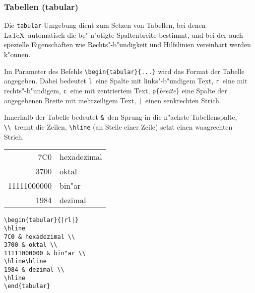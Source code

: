 \subsubsection{Tabellen (tabular)} \label{tabular}
 
Die \texttt{tabular}-Umgebung dient zum Setzen von Tabellen, bei
denen \LaTeX\ automatisch die be"-n"otigte Spaltenbreite
bestimmt, und bei der auch spezielle Eigenschaften wie
Rechts"-b"undigkeit und Hilfslinien vereinbart werden k"onnen.
 
Im Parameter des Befehls \verb|\begin{tabular}{...}| wird das
Format der Tabelle angegeben.
Dabei bedeutet
\texttt{l}~eine Spalte mit links"-b"undigem Text,
\texttt{r}~eine mit rechts"-b"undigem,
\texttt{c}~eine mit zentriertem Text,
\verb|p{|\textit{breite}\verb|}| eine Spalte der angegebenen
Breite mit mehrzeiligem Text,
\verb.|.~einen senkrechten Strich.
 
Innerhalb der Tabelle bedeutet
\verb|&|~den Sprung in die n"achste Tabellenspalte,
\verb|\\|~trennt die Zeilen,
\verb|\hline| (an Stelle einer Zeile) setzt einen waagrechten
Strich.
 
          \vspace{0pt plus 1cm}
\exa
\begin{tabular}[t]{|rl|}
\hline
7C0 & hexadezimal \\
3700 & oktal \\
11111000000 & bin"ar \\
\hline\hline
1984 & dezimal \\
\hline
\end{tabular}
\exb
\begin{verbatim}
\begin{tabular}{|rl|}
\hline
7C0 & hexadezimal \\
3700 & oktal \\
11111000000 & bin"ar \\
\hline\hline
1984 & dezimal \\
\hline
\end{tabular}
\end{verbatim}
\exc
 
\endinput
